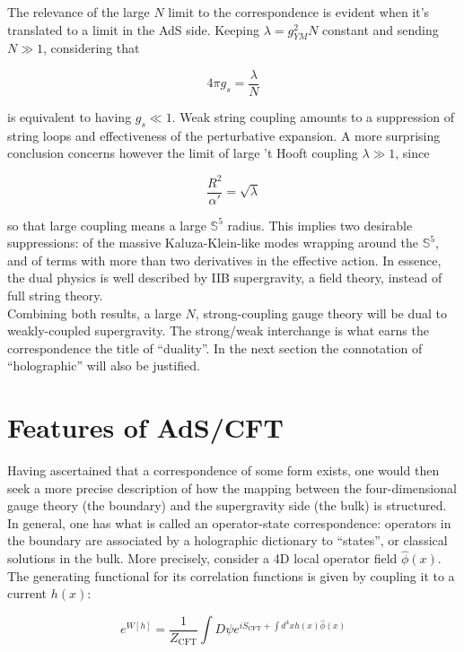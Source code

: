 The relevance of the large $N$ limit to the correspondence is evident when it's translated to a limit in the AdS side. Keeping $\lambda = g_{YM}^2 N$ constant and sending $N \gg 1$, considering that

\begin{equation}
	4\pi g_s = \frac{\lambda}{N}
	\label{}
\end{equation}

is equivalent to having $g_s \ll 1$. Weak string coupling amounts to a suppression of string loops and effectiveness of the perturbative expansion. A more surprising conclusion concerns however the limit of large 't Hooft coupling $\lambda \gg 1$, since

\begin{equation}
	\frac{R^2}{\alpha'} = \sqrt \lambda
	\label{}
\end{equation}

so that large coupling means a large $\mathbb{S}^5$ radius. This implies two desirable suppressions: of the massive Kaluza-Klein-like modes wrapping around the $\mathbb{S}^5$, and of terms with more than two derivatives in the effective action. In essence, the dual physics is well described by IIB supergravity, a field theory, instead of full string theory.\\

Combining both results, a large $N$, strong-coupling gauge theory will be dual to weakly-coupled supergravity. The strong/weak interchange is what earns the correspondence the title of ``duality''. In the next section the connotation of ``holographic'' will also be justified.



\section{Features of AdS/CFT}

Having ascertained that a correspondence of some form exists, one would then seek a more precise description of how the mapping between the four-dimensional gauge theory (the boundary) and the supergravity side (the bulk) is structured. In general, one has what is called an operator-state correspondence: operators in the boundary are associated by a holographic dictionary to ``states'', or classical solutions in the bulk. More precisely, consider a 4D local operator field $\hat \phi(x)$. The generating functional for its correlation functions is given by coupling it to a current $h(x)$:

\begin{equation}
	e^{W[h]} = \frac{1}{Z_\text{CFT}}\int D\psi e^{i S_\text{CFT} + \int d^4 x h(x) \hat \phi(x)}
\end{equation}

